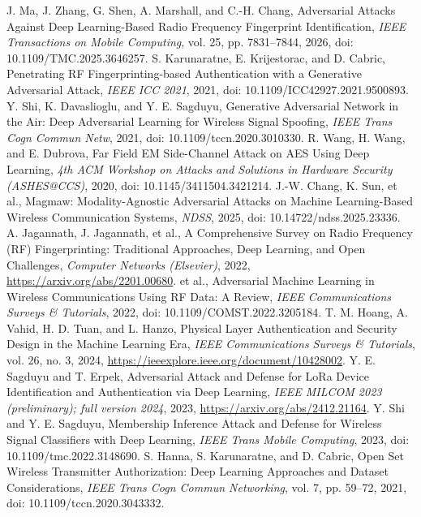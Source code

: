 J. Ma, J. Zhang, G. Shen, A. Marshall, and C.-H. Chang, Adversarial Attacks Against Deep Learning-Based Radio Frequency Fingerprint Identification, \emph{IEEE Transactions on Mobile Computing}, vol. 25, pp. 7831--7844, 2026, doi: 10.1109/TMC.2025.3646257.
S. Karunaratne, E. Krijestorac, and D. Cabric, Penetrating RF Fingerprinting-based Authentication with a Generative Adversarial Attack, \emph{IEEE ICC 2021}, 2021, doi: 10.1109/ICC42927.2021.9500893.
Y. Shi, K. Davaslioglu, and Y. E. Sagduyu, Generative Adversarial Network in the Air: Deep Adversarial Learning for Wireless Signal Spoofing, \emph{IEEE Trans Cogn Commun Netw}, 2021, doi: 10.1109/tccn.2020.3010330.
R. Wang, H. Wang, and E. Dubrova, Far Field EM Side-Channel Attack on AES Using Deep Learning, \emph{4th ACM Workshop on Attacks and Solutions in Hardware Security (ASHES@CCS)}, 2020, doi: 10.1145/3411504.3421214.
J.-W. Chang, K. Sun, et al., Magmaw: Modality-Agnostic Adversarial Attacks on Machine Learning-Based Wireless Communication Systems, \emph{NDSS}, 2025, doi: 10.14722/ndss.2025.23336.
A. Jagannath, J. Jagannath, et al., A Comprehensive Survey on Radio Frequency (RF) Fingerprinting: Traditional Approaches, Deep Learning, and Open Challenges, \emph{Computer Networks (Elsevier)}, 2022, \url{https://arxiv.org/abs/2201.00680}.
et al., Adversarial Machine Learning in Wireless Communications Using RF Data: A Review, \emph{IEEE Communications Surveys \& Tutorials}, 2022, doi: 10.1109/COMST.2022.3205184.
T. M. Hoang, A. Vahid, H. D. Tuan, and L. Hanzo, Physical Layer Authentication and Security Design in the Machine Learning Era, \emph{IEEE Communications Surveys \& Tutorials}, vol. 26, no. 3, 2024, \url{https://ieeexplore.ieee.org/document/10428002}.
Y. E. Sagduyu and T. Erpek, Adversarial Attack and Defense for LoRa Device Identification and Authentication via Deep Learning, \emph{IEEE MILCOM 2023 (preliminary); full version 2024}, 2023, \url{https://arxiv.org/abs/2412.21164}.
Y. Shi and Y. E. Sagduyu, Membership Inference Attack and Defense for Wireless Signal Classifiers with Deep Learning, \emph{IEEE Trans Mobile Computing}, 2023, doi: 10.1109/tmc.2022.3148690.
S. Hanna, S. Karunaratne, and D. Cabric, Open Set Wireless Transmitter Authorization: Deep Learning Approaches and Dataset Considerations, \emph{IEEE Trans Cogn Commun Networking}, vol. 7, pp. 59--72, 2021, doi: 10.1109/tccn.2020.3043332.
